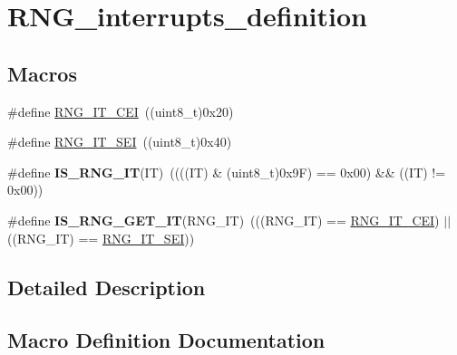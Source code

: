 \hypertarget{group___r_n_g__interrupts__definition}{}\section{R\+N\+G\+\_\+interrupts\+\_\+definition}
\label{group___r_n_g__interrupts__definition}
\subsection*{Macros}
\begin{DoxyCompactItemize}
\item 
\#define \hyperlink{group___r_n_g__interrupts__definition_ga8dabf5f116a92e59d18a224d14882927}{R\+N\+G\+\_\+\+I\+T\+\_\+\+C\+E\+I}~((uint8\+\_\+t)0x20)
\item 
\#define \hyperlink{group___r_n_g__interrupts__definition_ga2343cb323912a036fa46b081bbe751bc}{R\+N\+G\+\_\+\+I\+T\+\_\+\+S\+E\+I}~((uint8\+\_\+t)0x40)
\item 
\hypertarget{group___r_n_g__interrupts__definition_gaa110e0edaec1c15ed3a9620b001f8d91}{}\#define {\bfseries I\+S\+\_\+\+R\+N\+G\+\_\+\+I\+T}(I\+T)~((((I\+T) \& (uint8\+\_\+t)0x9\+F) == 0x00) \&\& ((\+I\+T) != 0x00))\label{group___r_n_g__interrupts__definition_gaa110e0edaec1c15ed3a9620b001f8d91}

\item 
\hypertarget{group___r_n_g__interrupts__definition_gafdbf6da44cfc8f3f2be5697a8fdf0595}{}\#define {\bfseries I\+S\+\_\+\+R\+N\+G\+\_\+\+G\+E\+T\+\_\+\+I\+T}(R\+N\+G\+\_\+\+I\+T)~(((R\+N\+G\+\_\+\+I\+T) == \hyperlink{group___r_n_g__interrupts__definition_ga8dabf5f116a92e59d18a224d14882927}{R\+N\+G\+\_\+\+I\+T\+\_\+\+C\+E\+I}) $\vert$$\vert$ ((R\+N\+G\+\_\+\+I\+T) == \hyperlink{group___r_n_g__interrupts__definition_ga2343cb323912a036fa46b081bbe751bc}{R\+N\+G\+\_\+\+I\+T\+\_\+\+S\+E\+I}))\label{group___r_n_g__interrupts__definition_gafdbf6da44cfc8f3f2be5697a8fdf0595}

\end{DoxyCompactItemize}


\subsection{Detailed Description}


\subsection{Macro Definition Documentation}
\hypertarget{group___r_n_g__interrupts__definition_ga8dabf5f116a92e59d18a224d14882927}{}
